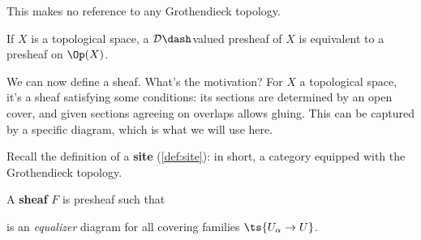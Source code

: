\begin{remark}

This makes no reference to any Grothendieck topology.

\end{remark}

\begin{example}[?]

If \(X\) is a topological space, a \(\mathcal{D}\dash\)valued presheaf
of \(X\) is equivalent to a presheaf on \(\Op(X)\).

\end{example}

We can now define a sheaf. What's the motivation? For \(X\) a
topological space, it's a sheaf satisfying some conditions: its sections
are determined by an open cover, and given sections agreeing on overlaps
allows gluing. This can be captured by a specific diagram, which is what
we will use here.

Recall the definition of a \textbf{site} (\cref{def:site}): in short, a
category equipped with the Grothendieck topology.

\begin{definition}[Sheaf]

A \textbf{sheaf} \(F\) is presheaf such that

\begin{center}
\end{center}

is an \emph{equalizer} diagram for all covering families
\(\ts{U_\alpha \to U}\).

\end{definition}

